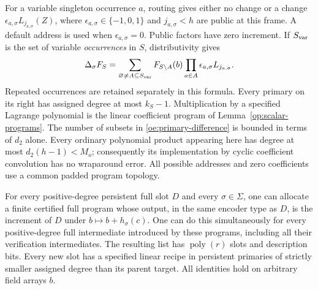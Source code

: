For a variable singleton occurrence $a$, routing gives either no change or
a change $\epsilon_{a,\sigma}L_{j_{a,\sigma}}(Z)$, where
$\epsilon_{a,\sigma}\in\{-1,0,1\}$ and $j_{a,\sigma}<h$ are public at
this frame. A default address is used when $\epsilon_{a,\sigma}=0$.
Public factors have zero increment. If $S_{\rm var}$ is the set of
variable \emph{occurrences} in $S$, distributivity gives
\begin{equation}\label{oe:primary-difference}
 \Delta_\sigma F_S
 =\sum_{\varnothing\ne A\subseteq S_{\rm var}}
     F_{S\setminus A}(b)
     \prod_{a\in A}\epsilon_{a,\sigma}L_{j_{a,\sigma}}.
\end{equation}
Repeated occurrences are retained separately in this formula. Every
primary on its right has assigned degree at most $k_S-1$. Multiplication
by a specified Lagrange polynomial is the linear coefficient program of
Lemma~\ref{op:scalar-programs}. The number of subsets in
\eqref{oe:primary-difference} is bounded in terms of $d_2$ alone.
Every ordinary polynomial product appearing here has degree at most
$d_2(h-1)<M_o$; consequently its implementation by cyclic coefficient
convolution has no wraparound error. All possible addresses and zero
coefficients use a common padded program topology.

\begin{lemma}\label{oe:derivative-closure}
For every positive-degree persistent full slot $D$ and every
$\sigma\in\Sigma$, one can allocate a finite certified full program whose
output, in the same encoder type as $D$, is the increment of $D$ under
$b\mapsto b+h_\sigma(c)$. One can do this simultaneously for every
positive-degree full intermediate introduced by these programs, including
all their verification intermediates. The resulting list has
$\operatorname{poly}(r)$ slots and description bits. Every new slot has a
specified linear recipe in persistent primaries of strictly smaller
assigned degree than its parent target. All identities hold on arbitrary
field arrays $b$.
\end{lemma}

